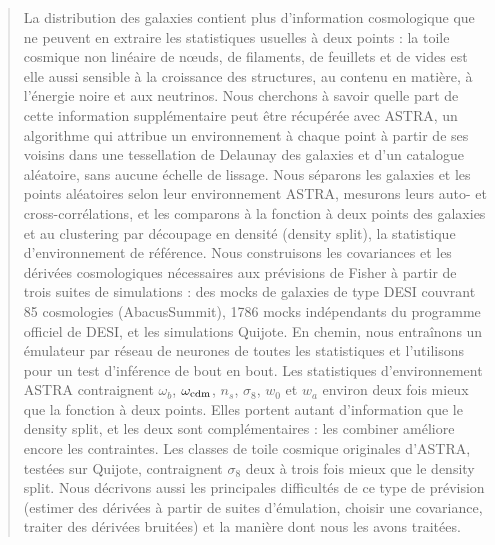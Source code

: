 \begin{abstract}
La distribution des galaxies contient plus d'information cosmologique que ne peuvent en extraire les statistiques usuelles à deux points : la toile cosmique non linéaire de nœuds, de filaments, de feuillets et de vides est elle aussi sensible à la croissance des structures, au contenu en matière, à l'énergie noire et aux neutrinos. Nous cherchons à savoir quelle part de cette information supplémentaire peut être récupérée avec ASTRA, un algorithme qui attribue un environnement à chaque point à partir de ses voisins dans une tessellation de Delaunay des galaxies et d'un catalogue aléatoire, sans aucune échelle de lissage. Nous séparons les galaxies et les points aléatoires selon leur environnement ASTRA, mesurons leurs auto- et cross-corrélations, et les comparons à la fonction à deux points des galaxies et au clustering par découpage en densité (density split), la statistique d'environnement de référence. Nous construisons les covariances et les dérivées cosmologiques nécessaires aux prévisions de Fisher à partir de trois suites de simulations : des mocks de galaxies de type DESI couvrant 85 cosmologies (AbacusSummit), 1786 mocks indépendants du programme officiel de DESI, et les simulations Quijote. En chemin, nous entraînons un émulateur par réseau de neurones de toutes les statistiques et l'utilisons pour un test d'inférence de bout en bout. Les statistiques d'environnement ASTRA contraignent $\omega_b$, $\omega_{\rm cdm}$, $n_s$, $\sigma_8$, $w_0$ et $w_a$ environ deux fois mieux que la fonction à deux points. Elles portent autant d'information que le density split, et les deux sont complémentaires : les combiner améliore encore les contraintes. Les classes de toile cosmique originales d'ASTRA, testées sur Quijote, contraignent $\sigma_8$ deux à trois fois mieux que le density split. Nous décrivons aussi les principales difficultés de ce type de prévision (estimer des dérivées à partir de suites d'émulation, choisir une covariance, traiter des dérivées bruitées) et la manière dont nous les avons traitées.
\end{abstract}
